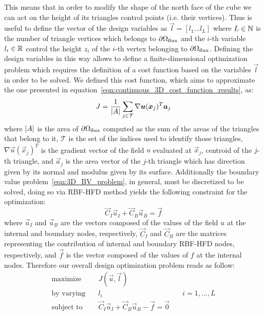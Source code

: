 This means that in order to modify the shape of the north face of the cube we can act on the height of its triangles control points (i.e. their vertices). Thus is useful to define the vector of the design variables as $\vec{l} = [l_1 \dots l_L]$ where $L \in \mathbb{N}$ is the number of triangle vertices which belongs to $\partial\Omega_\textup{flux}$ and the $i$-th variable $l_i \in \mathbb{R}$ control the height $z_i$ of the $i$-th vertex belonging to $\partial\Omega_\textup{flux}$. Defining the design variables in this way allows to define a finite-dimensional optimization problem which requires the definition of a cost function based on the variables $\vec{l}$ in order to be solved. We defined this cost function, which aims to approximate the one presented in equation~\eqref{eqn:continuous_3D_cost_function_results}, as:
\begin{equation}
	J = \frac{1}{\lvert A\rvert} \sum_{j \in \mathcal{T}} \nabla \boldsymbol{u}(\boldsymbol{x}_j)^T \boldsymbol{a}_j
\end{equation}
where $\lvert A\rvert$ is the area of $\partial\Omega_\textup{flux}$ computed as the sum of the areas of the triangles that belong to it, $\mathcal{T}$ is the set of the indices used to identify those triangles, $\nabla \vec{u}(\vec{x}_j)^T$ is the gradient vector of the field $u$ evaluated at $\vec{x}_j$, centroid of the $j$-th triangle, and $\vec{a}_j$ is the area vector of the $j$-th triangle which has direction given by its normal and modulus given by its surface.
Additionally the boundary value problem~\eqref{eqn:3D_BV_problem}, in general, must be discretized to be solved, doing so via RBF-HFD method yields the following constraint for the optimization:
\begin{equation}
	\label{eqn:3D_design_opt_constraint}
	\vec{C}_I\vec{u}_I + \vec{C}_B\vec{u}_B = \vec{f}
\end{equation}
where $\vec{u}_I$ and $\vec{u}_B$ are the vectors composed of the values of the field $u$ at the internal and boundary nodes, respectively, $\vec{C}_I$ and $ \vec{C}_B$ are the matrices representing the contribution of internal and boundary RBF-HFD nodes, respectively, and $\vec{f}$ is the vector composed of the values of $f$ at the internal nodes.
Therefore our overall design optimization problem reads as follow:
\begin{equation}
	\label{eqn:3D_design_opt_problem}
	\begin{aligned}
		\text{maximize} 		&  \quad J(\vec{u}, \vec{l})  										  \\
		\text{by varying} 		&  \quad l_i  & \quad i=1, \dots, L    \\
		\text{subject to}	 	&  \quad \vec{C}_I\vec{u}_I + \vec{C}_B\vec{u}_B - \vec{f} = \vec{0}  \\
	\end{aligned}
\end{equation}

